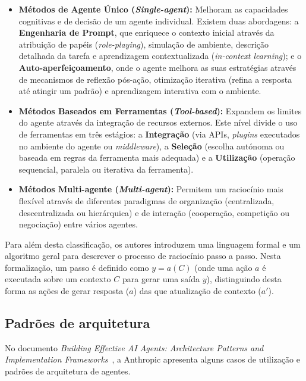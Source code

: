 \begin{itemize}
	\item \textbf{Métodos de Agente Único (\textit{Single-agent}):} Melhoram as capacidades cognitivas e de decisão de um agente individual. Existem duas abordagens: a \textbf{Engenharia de Prompt}, que enriquece o contexto inicial através da atribuição de papéis (\textit{role-playing}), simulação de ambiente, descrição detalhada da tarefa e aprendizagem contextualizada (\textit{in-context learning}); e o \textbf{Auto-aperfeiçoamento}, onde o agente melhora as suas estratégias através de mecanismos de reflexão pós-ação, otimização iterativa (refina a resposta até atingir um padrão) e aprendizagem interativa com o ambiente.
	
	\item \textbf{Métodos Baseados em Ferramentas (\textit{Tool-based}):} Expandem os limites do agente através da integração de recursos externos. Este nível divide o uso de ferramentas em três estágios: a \textbf{Integração} (via APIs, \textit{plugins} executados no ambiente do agente ou \textit{middleware}), a \textbf{Seleção} (escolha autónoma ou baseada em regras da ferramenta mais adequada) e a \textbf{Utilização} (operação sequencial, paralela ou iterativa da ferramenta).
	
	\item \textbf{Métodos Multi-agente (\textit{Multi-agent}):} Permitem um raciocínio mais flexível através de diferentes paradigmas de organização (centralizada, descentralizada ou hierárquica) e de interação (cooperação, competição ou negociação) entre vários agentes.
\end{itemize}

Para além desta classificação, os autores introduzem uma linguagem formal e um algoritmo geral para descrever o processo de raciocínio passo a passo. Nesta formalização, um passo é definido como $y = a(C)$ (onde uma ação $a$ é executada sobre um contexto $C$ para gerar uma saída $y$), distinguindo desta forma as ações de gerar resposta ($a$) das que atualização de contexto ($a'$).~\cite{zhao2025llm}

\subsection{Padrões de arquitetura}
No documento \textit{Building Effective AI Agents: Architecture Patterns and Implementation Frameworks}~\cite{anthropic2025agents}, a Anthropic apresenta alguns casos de utilização e padrões de arquitetura de agentes. 

